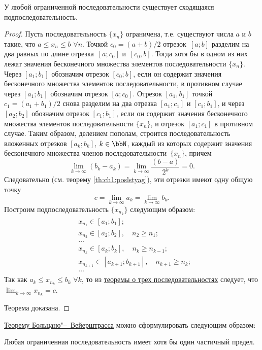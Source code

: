 \begin{thm}\label{th:ch1:TBV}
 У любой ограниченной последовательности существует сходящаяся подпоследовательность.
\end{thm}
\begin{proof}
Пусть последовательность $\{x_n\}$ ограничена, т.е. существуют числа $a$ и $b$ такие, что $a \le x_n \le b$ $\forall n$. Точкой
$c_0 = (a + b)/2$ отрезок~$[a; b]$ разделим на два равных по длине отрезка~$[a; c_0]$ и~$[c_0,b]$. Тогда хотя бы в одном из них лежат значения бесконечного множества элементов последовательности $\{x_n\}$. Через $[a_1;b_1]$ обозначим отрезок $[c_0;b]$, если он содержит значения бесконечного множества элементов последовательности, в противном случае через $[a_1; b_1]$ обозначим отрезок $[a; c_0]$. Отрезок $[a_1, b_1]$ точкой $c_1 = (a_1 + b_1)/2$ снова разделим на два отрезка $[a_1;c_1]$ и $[c_1;b_1]$, и через $[a_2;b_2]$ обозначим отрезок $[c_1;b_1]$, если он содержит значения бесконечного множества элементов последовательности $\{x_n\}$, и отрезок $[a_1; c_1]$ в противном случае. Таким образом, делением пополам, строится последовательность вложенных отрезков $[a_k;b_k]$, $k \in \bbN$, каждый из которых содержит значения бесконечного множества членов последовательности~$\{x_n\}$, причем
$$
\lim_{k\to \infty}(b_k-a_k)=\lim_{k \to \infty}\frac{(b-a)}{2^k}=0.
$$
Следовательно (см. теорему \ref{th:ch1:poslstyag}), эти отрезки имеют одну общую точку
$$
c = \lim_{k \to \infty} a_k = \lim_{k \to \infty} b_k.
$$
Построим подпоследовательность $\{x_{n_k}\}$ следующим образом:
\begin{gather*}
\begin{aligned}
& x_{n_1} \in [a_1;b_1];\\
& x_{n_2} \in [a_2;b_2],\quad n_2 \ge n_1;\\
& \ldots\\
& x_{n_k} \in [a_k;b_k],\quad n_k \ge n_{k-1};\\
& x_{n_{k+1}} \in [a_{k+1};b_{k+1}],\quad n_{k+1} \ge n_k;\\
& \ldots
\end{aligned}
\end{gather*}
Так как $a_k \le x_{n_k} \le b_k$ $\forall k$, то из \hyperref[th:ch1:otrehposled]{теоремы о трех последовательностях} следует, что $\lim_{k \to \infty}\limits x_{n_k} = c$.

Теорема доказана.
\end{proof}

\hyperref[th:ch1:TBV]{Теорему Больцано"--~Вейерштрасса} можно сформулировать следующим образом: 
\begin{thmn} Любая ограниченная последовательность имеет хотя бы один частичный предел.
\end{thmn}

